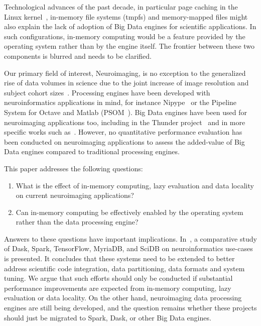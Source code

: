 \documentclass{IEEEtran}
\begin{document}
Technological advances of the past decade, in particular page caching 
in the Linux kernel~\cite{love2010linux}, in-memory file systems 
(tmpfs) and memory-mapped files might also 
explain the lack of adoption of Big Data engines for scientific 
applications. In such configurations, in-memory computing would be a feature 
provided by 
the operating system rather than by the engine itself. The frontier 
between these two components is blurred and needs to be clarified.



Our primary field of interest, Neuroimaging, is no exception to the 
generalized rise of data volumes in science due to the joint increase 
of image resolution and subject cohort sizes~\cite{van2014human}. 
Processing engines have been developed with neuroinformatics 
applications in mind, for instance Nipype~\cite{gorgolewski2011nipype} 
or the Pipeline System for Octave and Matlab 
(PSOM~\cite{bellec2012pipeline}). Big Data engines have been used for 
neuroimaging applications too, including in the Thunder 
project~\cite{freeman2014mapping} and in more specific works such 
as~\cite{makkie2019fast}. However, no quantitative performance 
evaluation has been conducted on neuroimaging applications to assess the 
added-value of Big Data engines compared to traditional processing engines.

This paper addresses the following questions:
\begin{enumerate}
\item What is the effect of in-memory computing, lazy evaluation and data locality on current neuroimaging applications?
\item Can in-memory computing be effectively enabled by the operating system rather than the data processing engine?
\end{enumerate}

Answers to these questions have important implications. 
In~\cite{mehta2017comparative}, a comparative study of Dask, Spark, 
TensorFlow, MyriaDB, and SciDB on neuroinformatics use-cases is 
presented. It concludes that these systems need to be extended to 
better address scientific code integration, data partitioning, data 
formats and system tuning. We argue 
that such efforts should only be conducted if substantial performance 
improvements are expected from in-memory computing, lazy 
evaluation or data 
locality. On the other hand, neuroimaging data processing engines are 
still being developed, and the question remains whether these 
projects should just be migrated to Spark, Dask, or other Big Data 
engines.
\end{document}
